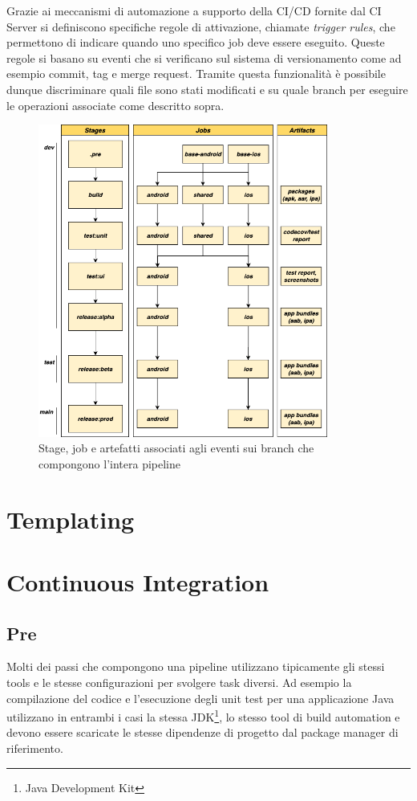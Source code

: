 Grazie ai meccanismi di automazione a supporto della CI/CD fornite dal CI Server si definiscono specifiche regole di attivazione, chiamate \textit{trigger rules}, che permettono di indicare quando uno specifico job deve essere eseguito. Queste regole si basano su eventi che si verificano sul sistema di versionamento come ad esempio commit, tag e merge request. Tramite questa funzionalità è possibile dunque discriminare quali file sono stati modificati e su quale branch per eseguire le operazioni associate come descritto sopra.

\begin{figure}[H]
    \centering
    \includegraphics[width=0.85\textwidth]{img/cicd-branch-jobs.png}
    \caption{Stage, job e artefatti associati agli eventi sui branch che compongono l'intera pipeline}
\end{figure}

\section{Templating}

\section{Continuous Integration}
\subsection{Pre}
Molti dei passi che compongono una pipeline utilizzano tipicamente gli stessi tools e le stesse configurazioni per svolgere task diversi. Ad esempio la compilazione del codice e l'esecuzione degli unit test per una applicazione Java utilizzano in entrambi i casi la stessa JDK\footnote{Java Development Kit}, lo stesso tool di build automation e devono essere scaricate le stesse dipendenze di progetto dal package manager di riferimento.

